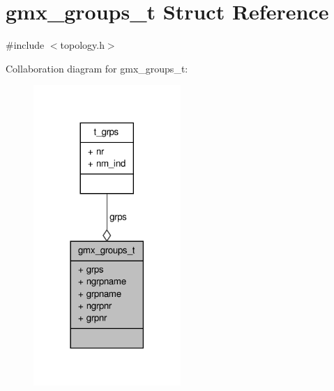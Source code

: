 \hypertarget{structgmx__groups__t}{\section{gmx\-\_\-groups\-\_\-t \-Struct \-Reference}
\label{structgmx__groups__t}
}


{\ttfamily \#include $<$topology.\-h$>$}



\-Collaboration diagram for gmx\-\_\-groups\-\_\-t\-:
\nopagebreak
\begin{figure}[H]
\begin{center}
\leavevmode
\includegraphics[width=158pt]{structgmx__groups__t__coll__graph}
\end{center}
\end{figure}
